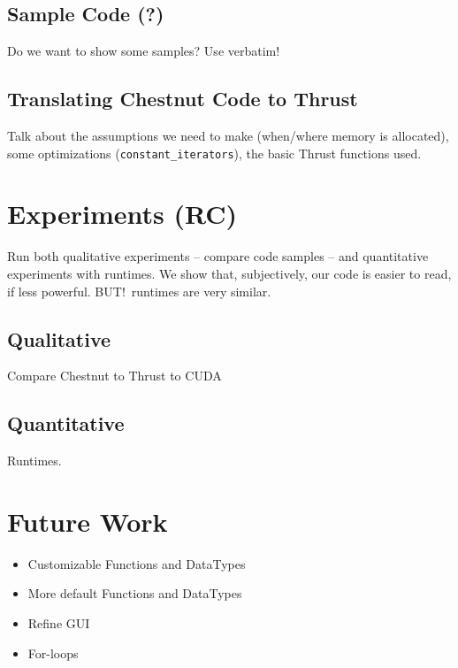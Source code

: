 \documentclass{article}
\renewcommand{\|}{\origbar} %
\newcommand{\code}[1]{\texttt{#1}}
\begin{document}
\subsection{Sample Code (?)}

Do we want to show some samples? Use verbatim!

\subsection{Translating Chestnut Code to Thrust}

Talk about the assumptions we need to make (when/where memory is allocated), some optimizations (\code{constant\_iterators}), the basic Thrust functions used.

\section{Experiments (RC)}

Run both qualitative experiments -- compare code samples -- and quantitative experiments with runtimes. We show that, subjectively, our code is easier to read, if less powerful. BUT!\ runtimes are very similar.

\subsection{Qualitative}

Compare Chestnut to Thrust to CUDA

\subsection{Quantitative}

Runtimes.

\section{Future Work}
\label{sec:future}

\begin{itemize}
  \item Customizable Functions and DataTypes
  \item More default Functions and DataTypes
  \item Refine GUI
  \item For-loops
\end{itemize}
\end{document}
